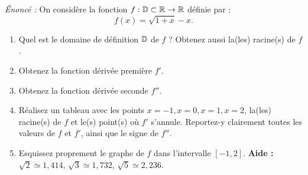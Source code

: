 \begin{exemple}
\emph{Énoncé :} On considère la fonction $f : \mathbb{D} \subset \mathbb{R} \to \mathbb{R}$ définie par :
\[
    f(x) = \sqrt{1 + x} - x.
\]
\begin{enumerate}[label=\alph*)]
    \item Quel est le domaine de définition $\mathbb{D}$ de $f$ ? Obtenez aussi la(les) racine(s) de $f$.
    \item Obtenez la fonction dérivée première $f'$.
    \item Obtenez la fonction dérivée seconde $f''$.
    \item Réalisez un tableau avec les points $x = -1, x = 0, x = 1, x = 2$, la(les) racine(s) de $f$ et le(s) point(s) où $f'$ s'annule. Reportez-y clairement toutes les valeurs de $f$ et $f'$, ainsi que le signe de $f''$.
    \item Esquissez proprement le graphe de $f$ dans l'intervalle $[-1, 2]$. \textbf{Aide :} $\sqrt{2} \simeq 1,414$, $\sqrt{3} \simeq 1,732$, $\sqrt{5} \simeq 2,236$.
\end{enumerate}


\end{exemple}
